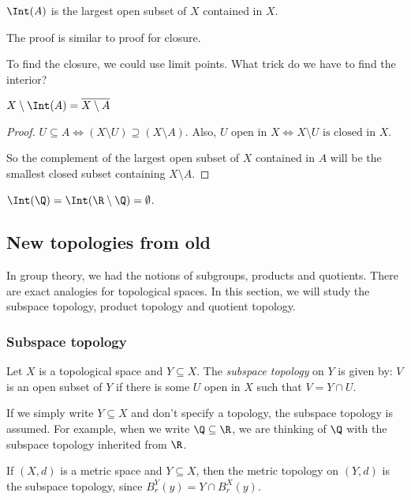 \documentclass[a4paper]{article}
\begin{document}
\begin{prop}
  $\Int(A)$ is the largest open subset of $X$ contained in $X$.
\end{prop}
The proof is similar to proof for closure.

To find the closure, we could use limit points. What trick do we have to find the interior?
\begin{prop}
  $X\setminus \Int(A) = \overline{X\setminus A}$
\end{prop}

\begin{proof}
  $U\subseteq A\Leftrightarrow (X\setminus U)\supseteq (X\setminus A)$. Also, $U\text{ open in }X\Leftrightarrow X\setminus U\text{ is closed in }X$.

  So the complement of  the largest open subset of $X$ contained in $A$ will be the smallest closed subset containing $X\setminus A$.
\end{proof}

\begin{eg}
  $\Int(\Q) = \Int(\R\setminus \Q) = \emptyset$.
\end{eg}

\subsection{New topologies from old}
In group theory, we had the notions of subgroups, products and quotients. There are exact analogies for topological spaces. In this section, we will study the subspace topology, product topology and quotient topology.

\subsubsection{Subspace topology}
\begin{defi}
  Let $X$ is a topological space and $Y\subseteq X$. The \emph{subspace topology} on $Y$ is given by: $V$ is an open subset of $Y$ if there is some $U$ open in $X$ such that $V = Y\cap U$.
\end{defi}
If we simply write $Y\subseteq X$ and don't specify a topology, the subspace topology is assumed. For example, when we write $\Q\subseteq \R$, we are thinking of $\Q$ with the subspace topology inherited from $\R$.

\begin{eg}
  If $(X, d)$ is a metric space and $Y\subseteq X$, then the metric topology on $(Y, d)$ is the subspace topology, since $B_r^Y(y) = Y\cap B_r^X(y)$.
\end{eg}
\end{document}
